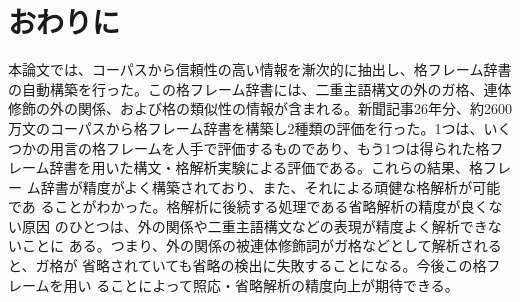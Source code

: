 \documentclass[fleqn]{nlp}
\begin{document}
\section{おわりに}

本論文では、コーパスから信頼性の高い情報を漸次的に抽出し、格フレーム辞書
の自動構築を行った。この格フレーム辞書には、二重主語構文の外のガ格、連体
修飾の外の関係、および格の類似性の情報が含まれる。新聞記事26年分、約2600 
万文のコーパスから格フレーム辞書を構築し2種類の評価を行った。1つは、いく
つかの用言の格フレームを人手で評価するものであり、もう1つは得られた格フ
レーム辞書を用いた構文・格解析実験による評価である。これらの結果、格フレー
ム辞書が精度がよく構築されており、また、それによる頑健な格解析が可能であ
ることがわかった。格解析に後続する処理である省略解析の精度が良くない原因
のひとつは、外の関係や二重主語構文などの表現が精度よく解析できないことに
ある。つまり、外の関係の被連体修飾詞がガ格などとして解析されると、ガ格が
省略されていても省略の検出に失敗することになる。今後この格フレームを用い
ることによって照応・省略解析の精度向上が期待できる。
\end{document}
